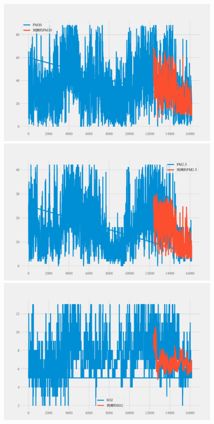 \documentclass[a4paper,10pt]{my_paper}
\numberwithin{equation}{section}
\begin{document}
\begin{figure}[htbp]
\begin{minipage}[c]{0.3\textwidth}
			\includegraphics[width=1\textwidth]{prob3/预测B地_PM10.pdf}
		\end{minipage}
		\begin{minipage}[c]{0.3\textwidth}
			\centering
			\includegraphics[width=1\textwidth]{prob3/预测B地_PM2..pdf} 
		\end{minipage}
    \begin{minipage}[c]{0.3\textwidth}
			\centering
			\includegraphics[width=1\textwidth]{prob3/预测B地_SO2.pdf} 

\end{minipage}
\end{figure}
\end{document}
